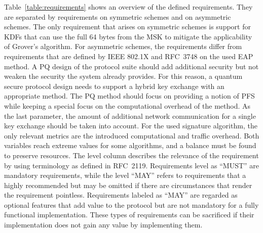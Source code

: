 Table~\ref{table:requirements} shows an overview of the defined requirements. They are separated by requirements on symmetric schemes and on asymmetric schemes. The only requirement that arises on symmetric schemes is support for \acp{KDF} that can use the full 64 bytes from the  \ac{MSK} to mitigate the applicability of Grover's algorithm. For asymmetric schemes, the requirements differ from requirements that are defined by IEEE 802.1X and RFC~3748 on the used \ac{EAP} method. A \ac{PQ} design of the protocol suite should add additional security but not weaken the security the system already provides. For this reason, a quantum secure protocol design needs to support a hybrid key exchange with an appropriate method. The \ac{PQ} method should focus on providing a notion of \ac{PFS} while keeping a special focus on the computational overhead of the method. As the last parameter, the amount of additional network communication for a single key exchange should be taken into account. For the used signature algorithm, the only relevant metrics are the introduced computational and traffic overhead. Both variables reach extreme values for some algorithms, and a balance must be found to preserve resources. The level column describes the relevance of the requirement by using terminology as defined in RFC~2119\cite{rfc2119}. Requirements level as ``MUST'' are mandatory requirements, while the level ``MAY'' refers to requirements that a highly recommended but may be omitted if there are circumstances that render the requirement pointless. Requirements labeled as ``MAY'' are regarded as optional features that add value to the protocol but are not mandatory for a fully functional implementation. These types of requirements can be sacrificed if their implementation does not gain any value by implementing them.

\endinput